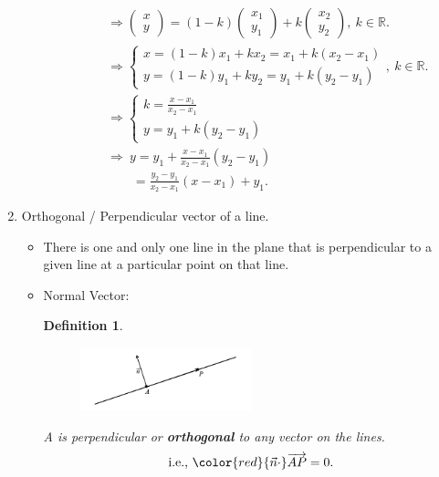\documentclass[12pt, a4paper]{article}
\newtheorem{definition}{Definition}[subsection]
\begin{document}
\begin{enumerate}
\begin{itemize}
\begin{enumerate}
$$\begin{aligned}
        &\Rightarrow \begin{pmatrix}x\\y\end{pmatrix}=\left(1-k\right)\begin{pmatrix}x_1\\y_1\end{pmatrix}+k\begin{pmatrix}x_2\\y_2\end{pmatrix},\ k\in\mathbb{R}.\\
        &\Rightarrow \begin{cases}x=(1-k)x_1+kx_2=x_1+k(x_2-x_1)\\y=(1-k)y_1+ky_2=y_1+k(y_2-y_1)\end{cases},\ k\in\mathbb{R}.\\
        &\Rightarrow \begin{cases}k=\frac{x-x_1}{x_2-x_1}\\y=y_1+k(y_2-y_1)\end{cases}\\
        &\Rightarrow\ y=y_1+\frac{x-x_1}{x_2-x_1}(y_2-y_1)\\
        &\ \ \ \ \ \ \ \ \ =\frac{y_2-y_1}{x_2-x_1}(x-x_1)+y_1.
      \end{aligned}$$
    \end{enumerate}
  \end{itemize}
  \item Orthogonal / Perpendicular vector of a line. 
  \begin{itemize}
    \item There is one and only one line in the plane that is perpendicular to a given line at a particular point on that line. 
    \item Normal Vector: 
    \begin{definition}
      \begin{figure}[H]
        \centering
        \includegraphics[width=0.5\textwidth]{Fig.3.9.jpg}
      \end{figure}
      A \textbf{\color{red}{normal vector}} is perpendicular or \textbf{orthogonal} to any vector on the lines. 
      $$\text{i.e., }{\color{red}{\vec{n}\cdot}\overrightarrow{AP}=0}.$$
    \end{definition}

\end{itemize}
\end{enumerate}
\end{document}
